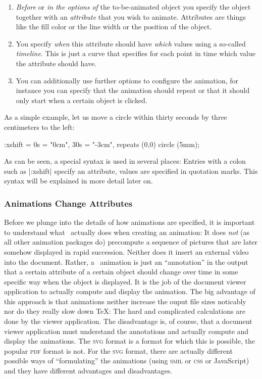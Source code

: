 \begin{enumerate}
\item \emph{Before} or \emph{in the options of} the to-be-animated
  object you specify the object together with an \emph{attribute}
  that you wish to animate. Attributes are things like the fill color
  or the line width or the position of the object.
\item You specify \emph{when} this attribute should have \emph{which}
  values using a so-called \emph{timeline}. This is just a curve that
  specifies for each point in time which value the attribute should
  have.
\item You can additionally use further options to configure
  the animation, for instance you can specify that the animation
  should repeat or that it should only start when a certain object is
  clicked. 
\end{enumerate}

As a simple example, let us move a circle within thirty seconds by three
centimeters to the left:

\begin{codeexample}[width=2cm]
\tikz \draw :xshift = {0s = "0cm", 30s = "-3cm", repeats} (0,0) circle (5mm);
\end{codeexample}

As can be seen, a special syntax is used in several places: Entries
with a colon such as |:xshift| specify an attribute, values
are specified in quotation marks. This syntax will be explained in 
more detail later on. 


\subsubsection{Animations Change Attributes}

Before we plunge into the details of how animations are specified, it
is important to understand what 
\tikzname\ actually does when creating an animation: It does
\emph{not} (as all other animation packages do) precompute a sequence of
pictures that are later somehow displayed in rapid succession. Neither
does it insert an external video into the document. Rather, a
\tikzname\ animation is just an ``annotation'' in the output that a
certain attribute of a certain object should change over time in some
specific way when the object is displayed. It is the job of the
document viewer application to actually compute and display the
animation. The big advantage of this approach is that animations neither
increase the ouput file sizes noticably nor do they really slow down
\TeX: The hard and complicated calculations are done by the viewer
application. The disadvantage is, of course, that a document viewer
application must understand the annotations and actually compute and
display the animations. The \textsc{svg} format is a format for which
this is possible, the popular \textsc{pdf} format is not. For the
\textsc{svg} format, there are actually different possible ways of
``formulating'' the animations (using \textsc{smil} or \textsc{css} or
JavaScript) and they have different advantages and disadvantages.

